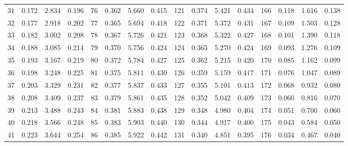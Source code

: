 \begin{table}
{\begin{tabular}{rrrr|rrrr|rrrr|rrrr}
 31 & \tiny{  0.172} &   2.834 & \tiny{  0.196} &  76 & \tiny{  0.362} &   5.660 & \tiny{  0.415} & 121 & \tiny{  0.374} &   5.421 & \tiny{  0.434} & 166 & \tiny{  0.118} &   1.616 & \tiny{  0.138}\\
 32 & \tiny{  0.177} &   2.918 & \tiny{  0.202} &  77 & \tiny{  0.365} &   5.694 & \tiny{  0.418} & 122 & \tiny{  0.371} &   5.372 & \tiny{  0.431} & 167 & \tiny{  0.109} &   1.503 & \tiny{  0.128}\\
 33 & \tiny{  0.182} &   3.002 & \tiny{  0.208} &  78 & \tiny{  0.367} &   5.726 & \tiny{  0.421} & 123 & \tiny{  0.368} &   5.322 & \tiny{  0.427} & 168 & \tiny{  0.101} &   1.390 & \tiny{  0.118}\\
 34 & \tiny{  0.188} &   3.085 & \tiny{  0.214} &  79 & \tiny{  0.370} &   5.756 & \tiny{  0.424} & 124 & \tiny{  0.365} &   5.270 & \tiny{  0.424} & 169 & \tiny{  0.093} &   1.276 & \tiny{  0.109}\\
 35 & \tiny{  0.193} &   3.167 & \tiny{  0.219} &  80 & \tiny{  0.372} &   5.784 & \tiny{  0.427} & 125 & \tiny{  0.362} &   5.215 & \tiny{  0.420} & 170 & \tiny{  0.085} &   1.162 & \tiny{  0.099}\\
 36 & \tiny{  0.198} &   3.248 & \tiny{  0.225} &  81 & \tiny{  0.375} &   5.811 & \tiny{  0.430} & 126 & \tiny{  0.359} &   5.159 & \tiny{  0.417} & 171 & \tiny{  0.076} &   1.047 & \tiny{  0.089}\\
 37 & \tiny{  0.203} &   3.329 & \tiny{  0.231} &  82 & \tiny{  0.377} &   5.837 & \tiny{  0.433} & 127 & \tiny{  0.355} &   5.101 & \tiny{  0.413} & 172 & \tiny{  0.068} &   0.932 & \tiny{  0.080}\\
 38 & \tiny{  0.208} &   3.409 & \tiny{  0.237} &  83 & \tiny{  0.379} &   5.861 & \tiny{  0.435} & 128 & \tiny{  0.352} &   5.042 & \tiny{  0.409} & 173 & \tiny{  0.060} &   0.816 & \tiny{  0.070}\\
 39 & \tiny{  0.213} &   3.488 & \tiny{  0.243} &  84 & \tiny{  0.381} &   5.883 & \tiny{  0.438} & 129 & \tiny{  0.348} &   4.980 & \tiny{  0.404} & 174 & \tiny{  0.051} &   0.700 & \tiny{  0.060}\\
 40 & \tiny{  0.218} &   3.566 & \tiny{  0.248} &  85 & \tiny{  0.383} &   5.903 & \tiny{  0.440} & 130 & \tiny{  0.344} &   4.917 & \tiny{  0.400} & 175 & \tiny{  0.043} &   0.584 & \tiny{  0.050}\\
 41 & \tiny{  0.223} &   3.644 & \tiny{  0.254} &  86 & \tiny{  0.385} &   5.922 & \tiny{  0.442} & 131 & \tiny{  0.340} &   4.851 & \tiny{  0.395} & 176 & \tiny{  0.034} &   0.467 & \tiny{  0.040}\\

\end{tabular}}
\end{table}
